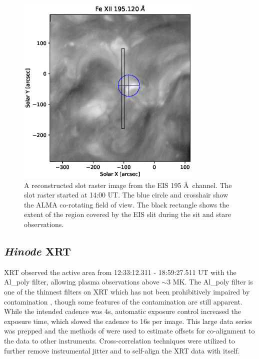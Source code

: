 \documentclass[twocolumn]{aastex62}
\begin{document}
\begin{figure}
    \centering
    \includegraphics[width=3.5in]{figures/EIS_example.eps}
    \caption{A reconstructed slot raster image from the EIS  195 \AA\ channel. The slot raster started at 14:00 UT.  The blue circle and crosshair show the ALMA co-rotating field of view.  The black rectangle shows the extent of the region covered by the EIS slit during the sit and stare observations.}
    \label{fig:EIS}
\end{figure}

\subsection{{\it Hinode} XRT}
XRT observed the active area from 12:33:12.311 -  18:59:27.511 UT with the Al\_poly filter, allowing plasma observations above $\sim$3 MK. The Al\_poly filter is one of the thinnest filters on XRT which has not been prohibitively impaired by contamination \citep[][]{2011NarukageEA_XRT3}, though some features of the contamination are still apparent. While the intended cadence was 4s, automatic exposure control increased the exposure time, which slowed the cadence to 16s per image. This large data series was prepped \citep[][]{2014KobelskiEA_xrtprep} and the methods of \citet{2015YoshimuraMcKenzie_XRTcoalign} were used to estimate offsets for co-alignment to the data to other instruments. Cross-correlation techniques \citep[such as {\tt tr\_get\_disp.pro} in SolarSoft;][]{1998FreelandHandy_SSW} were utilized to further remove instrumental jitter and to self-align the XRT data with itself.
\end{document}
